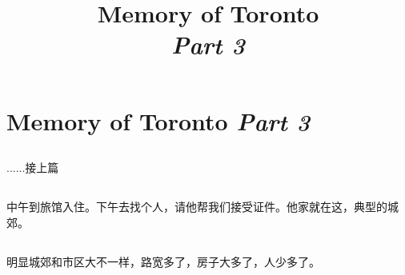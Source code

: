 ﻿\documentclass[hyperref={bookmarks=true},xcolor=pdflatex,svgnames,table,compress]{beamer}
\title{Memory of Toronto\\ \textit{Part 3}}
\author{}
\date{}
\begin{document}
\begin{frame}
\titlepage
\end{frame}

\section{Memory of Toronto {\itshape Part 3}}

\subsection{}
\begin{frame}
\begin{ztebox}
......接上篇
\end{ztebox}
\end{frame}

\subsection{}
\begin{frame}
\begin{ztebox}
中午到旅馆入住。下午去找个人，请他帮我们接受证件。他家就在这，典型的城郊。
\end{ztebox}
\end{frame}

\subsection{}
\begin{frame}
\begin{ztebox}
明显城郊和市区大不一样，路宽多了，房子大多了，人少多了。
\end{ztebox}
\end{frame}

\subsection{}
\begin{frame}
\end{frame}

\subsection{}
\begin{frame}
\end{frame}

\subsection{}
\begin{frame}
\end{frame}
\end{document}
